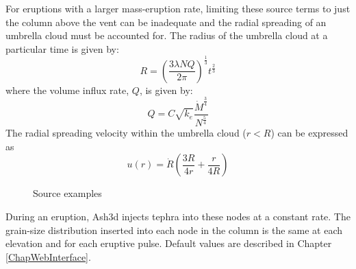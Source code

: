 For eruptions with a larger mass-eruption rate, limiting these source terms to just
the column above the vent can be inadequate and the radial spreading of an
umbrella cloud must be accounted for. The radius of the umbrella cloud at a
particular time is given by:
\begin{equation}
 R = \left( \frac{3 \lambda N Q}{2 \pi}\right)^{\frac{1}{3}} t^{\frac{2}{3}}  \label{EqUmbRad}
\end{equation}
where the volume influx rate, $Q$, is given by:
\begin{equation}
 Q = C \sqrt{k_e} \frac{\dot{M}^{\frac{3}{4}}}{N^{\frac{5}{4}}} \label{EqUmbQ}
\end{equation}
The radial spreading velocity within the umbrella cloud ($r<R$) can be expressed as
\begin{equation}
 u(r) = \dot{R} \left( \frac{3 R}{4 r} + \frac{r}{4R}\right) \label{EqUmbRadVelCost}
\end{equation}




\begin{figure}[htbp]
\parbox{15cm}{\caption{\label{FigSourceExample}
Source examples}}
\end{figure}

During an eruption, Ash3d injects tephra into these nodes at a constant
rate. The grain-size distribution inserted into each node in the column
is the same at each elevation and for each eruptive pulse.
Default values are described in Chapter \ref{ChapWebInterface}.

